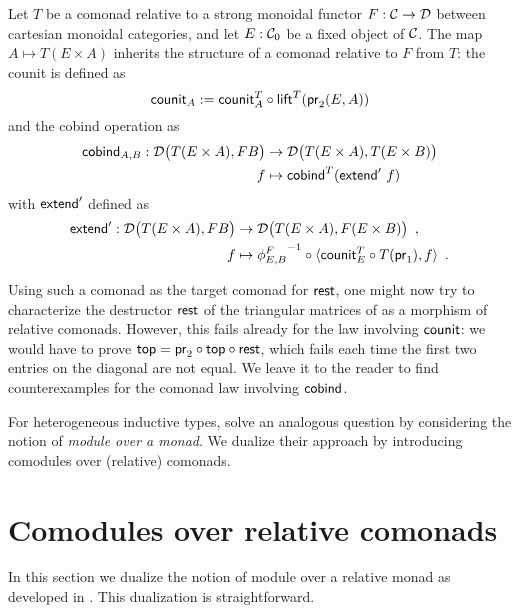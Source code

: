 \documentclass{amsart}
\begin{document}
\begin{definition}\label{product_comonad}
  Let $T$ be a comonad relative to a strong monoidal functor $F:\C\to\D$ between cartesian monoidal categories,
  and let $E:\C_0$ be a fixed object of $\C$.
 The map $A\mapsto T(E\times A)$ inherits the structure of a comonad relative to $F$ from $T$: the 
 counit is defined as
   \[ \counit_A := \comp{\lift^T(\pr_2(E,A))}{\counit^T_{A}} \]
  and the cobind operation as
   \begin{align*} 
            \cobind_{A,B} : \D\bigl(T(E\times A),FB\bigr) &\to \D\bigl(T(E\times A),T(E\times B)\bigr) \\
              f &\mapsto  \cobind^T(\extend'~f)
   \end{align*}
  with $\extend'$ defined as 
  \begin{align*} \extend' : \D\bigl(T(E\times A),FB\bigr) &\to \D\bigl(T(E\times A), F(E\times B)\bigr) \enspace , \\ 
                                            f & \mapsto \comp{\langle \comp{T(\pr_1)}{\counit^T_E}, f \rangle}{{\phi^{F}_{E,B}}^{-1}} \enspace .
  \end{align*}
\end{definition}
 Using such a comonad as the target comonad for $\tail$, one might now 
 try to characterize the destructor $\tail$ of the triangular matrices of 
 as a morphism of relative comonads.
 However, this fails already for the law involving $\counit$: we would have to prove $\head = \comp{\tail}{\comp{\head}{\pr_2}}$,
 which fails each time the first two entries on the diagonal are not equal.
 We leave it to the reader to find counterexamples for the comonad law involving $\cobind$.

For heterogeneous inductive types, \textcite{DBLP:journals/iandc/HirschowitzM10} solve an analogous question by considering the notion of
\emph{module over a monad}. We  dualize their approach by introducing comodules over (relative) comonads.



\section{Comodules over relative comonads}\label{sec:comodules}

In this section we dualize the notion of module over a relative monad as developed in \parencite{ahrens_relmonads}.
This dualization is straightforward.
\end{document}
